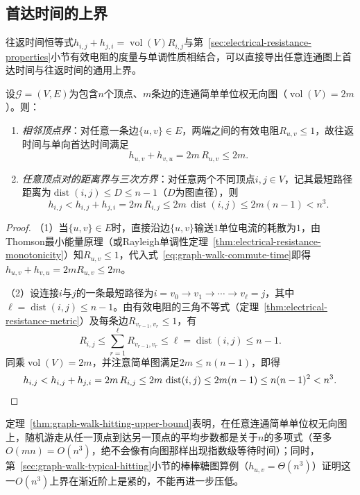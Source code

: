 \subsection{首达时间的上界}
\label{sec:graph-walk-hitting-bounds}

往返时间恒等式$h_{i,j}+h_{j,i}=\operatorname{vol}(V)R_{i,j}$与第~\ref{sec:electrical-resistance-properties}小节有效电阻的度量与单调性质相结合，可以直接导出任意连通图上首达时间与往返时间的通用上界。

\begin{theorem}[首达时间与往返时间的通用上界]
\label{thm:graph-walk-hitting-upper-bound}
设$\mathcal G=(V,E)$为包含$n$个顶点、$m$条边的连通简单单位权无向图（$\operatorname{vol}(V)=2m$）。则：
\begin{enumerate}
\item \emph{相邻顶点界}：对任意一条边$\{u,v\}\in E$，两端之间的有效电阻$R_{u,v}\leq 1$，故往返时间与单向首达时间满足
\begin{equation}
  h_{u,v} + h_{v,u} = 2m\,R_{u,v} \leq 2m.
  \label{eq:graph-walk-adjacent-hitting-bound}
\end{equation}
\item \emph{任意顶点对的距离界与三次方界}：对任意两个不同顶点$i,j\in V$，记其最短路径距离为$\operatorname{dist}(i,j)\leq D\leq n-1$（$D$为图直径），则
\begin{equation}
  h_{i,j} < h_{i,j} + h_{j,i} = 2m\,R_{i,j} \leq 2m\,\operatorname{dist}(i,j) \leq 2m(n-1) < n^3.
  \label{eq:graph-walk-general-hitting-bound}
\end{equation}
\end{enumerate}
\end{theorem}

\begin{proof}
（1）当$\{u,v\}\in E$时，直接沿边$\{u,v\}$输送$1$单位电流的耗散为$1$，由Thomson最小能量原理（或Rayleigh单调性定理~\ref{thm:electrical-resistance-monotonicity}）知$R_{u,v}\leq 1$，代入式~\eqref{eq:graph-walk-commute-time}即得$h_{u,v}+h_{v,u}=2m R_{u,v}\leq 2m$。

（2）设连接$i$与$j$的一条最短路径为$i=v_0\to v_1\to\cdots\to v_\ell=j$，其中$\ell=\operatorname{dist}(i,j)\leq n-1$。由有效电阻的三角不等式（定理~\ref{thm:electrical-resistance-metric}）及每条边$R_{v_{r-1},v_r}\leq 1$，有
\[
  R_{i,j} \leq \sum_{r=1}^\ell R_{v_{r-1},v_r} \leq \ell = \operatorname{dist}(i,j) \leq n-1.
\]
同乘$\operatorname{vol}(V)=2m$，并注意简单图满足$2m\leq n(n-1)$，即得
\[
  h_{i,j} < h_{i,j}+h_{j,i} = 2m\,R_{i,j} \leq 2m\,\operatorname{dist}(i,j) \leq 2m(n-1) \leq n(n-1)^2 < n^3.\qedhere
\]
\end{proof}

定理~\ref{thm:graph-walk-hitting-upper-bound}表明，在任意连通简单单位权无向图上，随机游走从任一顶点到达另一顶点的平均步数都是关于$n$的多项式（至多$O(mn)=O(n^3)$，绝不会像有向图那样出现指数级等待时间）；同时，第~\ref{sec:graph-walk-typical-hitting}小节的棒棒糖图算例（$h_{u,v}=\Theta(n^3)$）证明这一$O(n^3)$上界在渐近阶上是紧的，不能再进一步压低。
